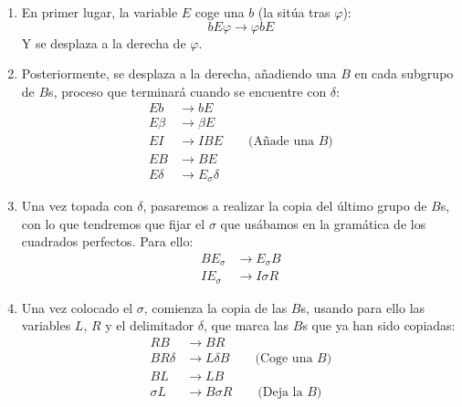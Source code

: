 \begin{ejercicio}
\begin{enumerate}
            \begin{enumerate}
                \item En primer lugar, la variable $E$ coge una $b$ (la sitúa tras $\varphi$):
                    \begin{equation*}
                        bE\varphi \rightarrow \varphi bE
                    \end{equation*}
                    Y se desplaza a la derecha de $\varphi$.
                \item Posteriormente, se desplaza a la derecha, añadiendo una $B$ en cada subgrupo de $B$s, proceso que terminará cuando se encuentre con $\delta$:
                    \begin{align*}
                        Eb &\rightarrow bE \\
                        E\beta &\rightarrow \beta E \\
                        EI &\rightarrow IBE \qquad \text{(Añade una\ } B \text{)} \\
                        EB &\rightarrow BE \\
                        E\delta &\rightarrow E_{\sigma}\delta
                    \end{align*}
                \item Una vez topada con $\delta$, pasaremos a realizar la copia del último grupo de $B$s, con lo que tendremos que fijar el $\sigma$ que usábamos en la gramática de los cuadrados perfectos. Para ello:
                    \begin{align*}
                        BE_{\sigma} &\rightarrow E_{\sigma}B \\
                        IE_{\sigma} &\rightarrow I\sigma R
                    \end{align*}
                \item Una vez colocado el $\sigma$, comienza la copia de las $B$s, usando para ello las variables $L$, $R$ y el delimitador $\delta$, que marca las $B$s que ya han sido copiadas:
                    \begin{align*}
                        RB &\rightarrow BR \\
                        BR\delta &\rightarrow L\delta B \qquad \text{(Coge una $B$)} \\
                        BL &\rightarrow LB \\
                        \sigma L &\rightarrow B\sigma R \qquad \text{(Deja la $B$)}
                    \end{align*}

\end{enumerate}
\end{enumerate}
\end{ejercicio}
